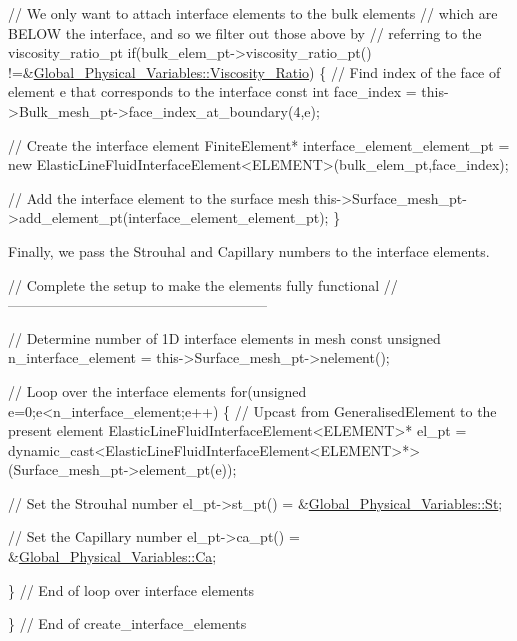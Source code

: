 \begin{DoxyCodeInclude}
   \textcolor{comment}{// We only want to attach interface elements to the bulk elements}
   \textcolor{comment}{// which are BELOW the interface, and so we filter out those above by}
   \textcolor{comment}{// referring to the viscosity\_ratio\_pt}
   \textcolor{keywordflow}{if}(bulk\_elem\_pt->viscosity\_ratio\_pt()
      !=&\hyperlink{namespaceGlobal__Physical__Variables_adb51428300a01b19395c43c0d3586d6f}{Global\_Physical\_Variables::Viscosity\_Ratio})
    \{
     \textcolor{comment}{// Find index of the face of element e that corresponds to the interface}
     \textcolor{keyword}{const} \textcolor{keywordtype}{int} face\_index = this->Bulk\_mesh\_pt->face\_index\_at\_boundary(4,e);
     
     \textcolor{comment}{// Create the interface element}
     FiniteElement* interface\_element\_element\_pt =
      \textcolor{keyword}{new} ElasticLineFluidInterfaceElement<ELEMENT>(bulk\_elem\_pt,face\_index);

     \textcolor{comment}{// Add the interface element to the surface mesh}
     this->Surface\_mesh\_pt->add\_element\_pt(interface\_element\_element\_pt);
    \}

\end{DoxyCodeInclude}


Finally, we pass the Strouhal and Capillary numbers to the interface elements.


\begin{DoxyCodeInclude}
 \textcolor{comment}{// Complete the setup to make the elements fully functional}
 \textcolor{comment}{// --------------------------------------------------------}

 \textcolor{comment}{// Determine number of 1D interface elements in mesh}
 \textcolor{keyword}{const} \textcolor{keywordtype}{unsigned} n\_interface\_element = this->Surface\_mesh\_pt->nelement();

 \textcolor{comment}{// Loop over the interface elements}
 \textcolor{keywordflow}{for}(\textcolor{keywordtype}{unsigned} e=0;e<n\_interface\_element;e++)
  \{
   \textcolor{comment}{// Upcast from GeneralisedElement to the present element}
   ElasticLineFluidInterfaceElement<ELEMENT>* el\_pt = 
    \textcolor{keyword}{dynamic\_cast<}ElasticLineFluidInterfaceElement<ELEMENT>*\textcolor{keyword}{>}
    (Surface\_mesh\_pt->element\_pt(e));

   \textcolor{comment}{// Set the Strouhal number}
   el\_pt->st\_pt() = &\hyperlink{namespaceGlobal__Physical__Variables_a4b6ef72bd221361c37f5b9a4a6899afc}{Global\_Physical\_Variables::St};

   \textcolor{comment}{// Set the Capillary number}
   el\_pt->ca\_pt() = &\hyperlink{namespaceGlobal__Physical__Variables_a8b32b93d2e546f9375ec418474107838}{Global\_Physical\_Variables::Ca};

  \} \textcolor{comment}{// End of loop over interface elements}

\} \textcolor{comment}{// End of create\_interface\_elements}

\end{DoxyCodeInclude}




